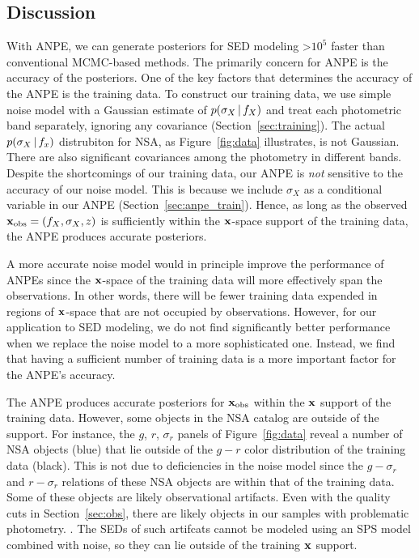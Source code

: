 \subsection{Discussion} \label{sec:discuss}
With ANPE, we can generate posteriors for SED modeling >$10^5$ faster than
conventional MCMC-based methods. 
The primarily concern for ANPE is the accuracy of the posteriors.
One of the key factors that determines the accuracy of the ANPE is the training
data.  
To construct our training data, we use simple noise model with a Gaussian
estimate of $p(\sigma_X\,|\, f_X)$ and treat each photometric band separately,
ignoring any covariance (Section~\ref{sec:training}). 
The actual $p(\sigma_X\,|\, f_x)$ distrubiton for NSA, as
Figure~\ref{fig:data} illustrates, is not Gaussian. 
There are also significant covariances among the photometry in different bands.
Despite the shortcomings of our training data, our ANPE is \emph{not}
sensitive to the accuracy of our noise model. 
This is because we include $\sigma_X$ as a conditional variable in our ANPE 
(Section~\ref{sec:anpe_train}).
Hence, as long as the observed ${\bf x}_{\rm obs} = (f_X, \sigma_X, z)$ is
sufficiently within the ${\bf x}$-space support of the training data, the ANPE
produces accurate posteriors. 

A more accurate noise model would in principle improve the performance of ANPEs
since the ${\bf x}$-space of the training data will more effectively span the
observations. 
In other words, there will be fewer training data expended in regions of 
${\bf x}$-space that are not occupied by observations.  
However, for our application to SED modeling, we do not find significantly  
better performance when we replace the noise model to a more sophisticated one.
Instead, we find that having a sufficient number of training data is a more
important factor for the ANPE's accuracy. 

The ANPE produces accurate posteriors for ${\bf x}_{\rm obs}$ within the 
${\bf x}$ support of the training data. 
However, some objects in the NSA catalog are outside of the support. 
For instance, the $g$, $r$, $\sigma_r$ panels of Figure~\ref{fig:data} reveal a
number of NSA objects (blue) that lie outside of the $g-r$ color distribution
of the training data (black). 
This is not due to deficiencies in the noise model since the $g-\sigma_r$ and
$r-\sigma_r$ relations of these NSA objects are within that of the training 
data. 
Some of these objects are likely observational artifacts. 
Even with the quality cuts in Section~\ref{sec:obs}, there are likely objects
in our samples with problematic photometry.  
. 
The SEDs of such artifcats cannot be modeled using an SPS model combined with
noise, so they can lie outside of the training ${\bf x}$ support.

